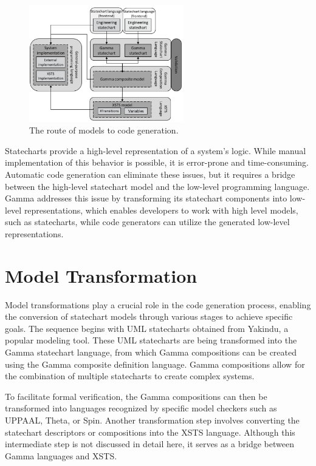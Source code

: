 \begin{figure}[h]
	\centering
	\includegraphics[width=0.6\textwidth]{images/gamma.png}
	\caption{The route of models to code generation.}
	\label{fig:gamma}
\end{figure}

Statecharts provide a high-level representation of a system's logic. While manual implementation of this behavior is possible, it is error-prone and time-consuming. Automatic code generation can eliminate these issues, but it requires a bridge between the high-level statechart model and the low-level programming language. Gamma addresses this issue by transforming its statechart components into low-level representations, which enables developers to work with high level models, such as statecharts, while code generators can utilize the generated low-level representations.

\section{Model Transformation}

Model transformations play a crucial role in the code generation process, enabling the conversion of statechart models through various stages to achieve specific goals. The sequence begins with UML statecharts obtained from Yakindu, a popular modeling tool. These UML statecharts are being transformed into the Gamma statechart language, from which Gamma compositions can be created using the Gamma composite definition language. Gamma compositions allow for the combination of multiple statecharts to create complex systems.

To facilitate formal verification, the Gamma compositions can then be transformed into languages recognized by specific model checkers such as UPPAAL, Theta, or Spin. Another transformation step involves converting the statechart descriptors or compositions into the XSTS language. Although this intermediate step is not discussed in detail here, it serves as a bridge between Gamma languages and XSTS.

